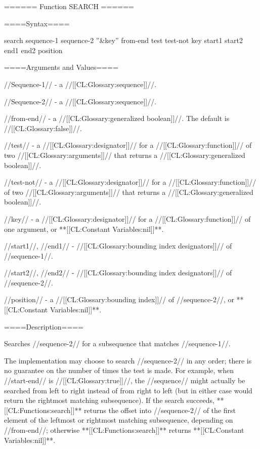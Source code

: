 ====== Function SEARCH ======

====Syntax====

\DefunWithValuesNewline search {sequence-1 sequence-2 ''&key'' from-end test test-not key start1 start2 end1 end2} {position}

====Arguments and Values====

//Sequence-1// - a //[[CL:Glossary:sequence]]//.

//Sequence-2// - a //[[CL:Glossary:sequence]]//.

//from-end// - a //[[CL:Glossary:generalized boolean]]//. The default is //[[CL:Glossary:false]]//.

//test// - a //[[CL:Glossary:designator]]// for a //[[CL:Glossary:function]]// of two //[[CL:Glossary:arguments]]// that returns a //[[CL:Glossary:generalized boolean]]//.

//test-not// - a //[[CL:Glossary:designator]]// for a //[[CL:Glossary:function]]// of two //[[CL:Glossary:arguments]]// that returns a //[[CL:Glossary:generalized boolean]]//.

//key// - a //[[CL:Glossary:designator]]// for a //[[CL:Glossary:function]]// of one argument, or **[[CL:Constant Variables:nil]]**.

//start1//, //end1// - //[[CL:Glossary:bounding index designators]]// of //sequence-1//. 

//start2//, //end2// - //[[CL:Glossary:bounding index designators]]// of //sequence-2//. 

//position// - a //[[CL:Glossary:bounding index]]// of //sequence-2//, or **[[CL:Constant Variables:nil]]**.

====Description====

Searches //sequence-2// for a subsequence that matches //sequence-1//.

The implementation may choose to search //sequence-2// in any order; there is no guarantee on the number of times the test is made. For example, when //start-end// is //[[CL:Glossary:true]]//, the //sequence// might actually be searched from left to right instead of from right to left (but in either case would return the rightmost matching subsequence). If the search succeeds, **[[CL:Functions:search]]** returns the offset into //sequence-2// of the first element of the leftmost or rightmost matching subsequence, depending on //from-end//; otherwise **[[CL:Functions:search]]** returns **[[CL:Constant Variables:nil]]**.

